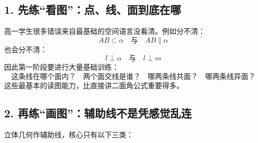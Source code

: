 \documentclass[11pt,a4paper]{ctexart}
\begin{document}
\subsection*{1. 先练“看图”：点、线、面到底在哪}
高一学生很多错误来自最基础的空间语言没看清。例如分不清：
\[ AB\subset \alpha \quad \text{与} \quad AB\parallel \alpha \]
也会分不清：
\[ l\perp \alpha \quad \text{与} \quad l\perp m \]
因此第一阶段要进行大量基础训练：
\[
  \boxed{
  \text{这条线在哪个面内？} \quad
  \text{两个面交线是谁？} \quad
  \text{哪两条线共面？} \quad
  \text{哪两条线异面？}
  }
\]
这些最基本的读图能力，比直接讲二面角公式重要得多。

\subsection*{2. 再练“画图”：辅助线不是凭感觉乱连}
立体几何作辅助线，核心只有以下三类：
\end{document}
